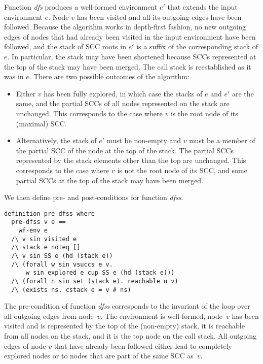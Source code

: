 \documentclass[sigplan,10pt,anonymous,review]{acmart}
\newcommand{\prog}[1]{\textit{#1}}
\begin{document}
Function \prog{dfs} produces a well-formed environment $e'$ that extends the input environment $e$. Node $v$ has been visited and all its outgoing edges have been followed. Because the algorithm works in depth-first fashion, no new outgoing edges of nodes that had already been visited in the input environment have been followed, and the stack of SCC roots in $e'$ is a suffix of the corresponding stack of $e$.
In particular, the stack may have been shortened because SCCs represented at the top of the stack may have been merged. The call stack is reestablished as it was in $e$. There are two possible outcomes of the algorithm:
\begin{itemize}
\item Either $v$ has been fully explored, in which case the stacks of $e$ and $e'$ are the same, and the partial SCCs of all nodes represented on the stack are unchanged. This corresponds to the case where $v$ is the root node of its (maximal) SCC.
\item Alternatively, the stack of $e'$ must be non-empty and $v$ must be a member of the partial SCC of the node at the top of the stack. The partial SCCs represented by the stack elements other than the top are unchanged. This corresponds to the case where $v$ is not the root node of its SCC, and some partial SCCs at the top of the stack may have been merged.
\end{itemize}

We then define pre- and post-conditions for function \prog{dfss}.

\begin{small}
\begin{lstlisting}[language=isabelle]
definition pre-dfss where 
  pre-dfss v e ==
    wf-env e 
  /\ v sin visited e
  /\ stack e noteq []
  /\ v sin SS e (hd (stack e))
  /\ (forall w sin vsuccs e v.
      w sin explored e cup SS e (hd (stack e)))
  /\ (forall n sin set (stack e). reachable n v)
  /\ (exists ns. cstack e = v # ns)
\end{lstlisting}
\end{small}

The pre-condition of function \prog{dfss} corresponds to the invariant of the loop over all outgoing edges from node~$v$. The environment is well-formed, node~$v$ has been visited and is represented by the top of the (non-empty) stack, it is reachable from all nodes on the stack, and it is the top node on the call stack. All outgoing edges of node $v$ that have already been followed either lead to completely explored nodes or to nodes that are part of the same SCC as~$v$.
\end{document}
